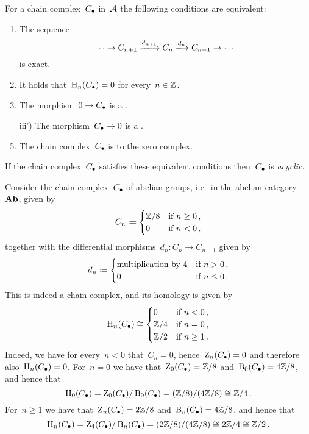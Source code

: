 \begin{remarkdefinition}
  For a chain complex~$C_\bullet$ in~$\mathcal{A}$ the following conditions are equivalent:
  \begin{enumerate}
    \item
      The sequence
      \[
        \dotsb
        \to
        C_{n+1}
        \xlongto{d_{n+1}}
        C_n
        \xlongto{d_n}
        C_{n-1}
        \to
        \dotsb
      \]
      is exact.
    \item
      It holds that~$\operatorname{H}_n(C_\bullet) = 0$ for every~$n \in \mathbb{Z}$.
    \item
      The morphism~$0 \to C_\bullet$ is a {\qim}.
    \item[iii')]
      The morphism~$C_\bullet \to 0$ is a {\qim}.
    \item
      The chain complex~$C_\bullet$ is {\qic} to the zero complex.
  \end{enumerate}
  If the chain complex~$C_\bullet$ satisfies these equivalent conditions then~$C_\bullet$ is \emph{acyclic}.
\end{remarkdefinition}


\begin{example}
  Consider the chain complex~$C_\bullet$ of abelian groups, i.e.\ in the abelian category~$\mathbf{Ab}$, given by
  \[
              C_n
    \coloneqq  \begin{cases}
                \mathbb{Z}/8  & \text{if~$n \geq 0$}  \,, \\
                0           & \text{if~$n < 0$} \,,
              \end{cases}
  \]
  together with the differential morphisms~$d_n \colon C_n \to C_{n-1}$ given by
  \[
              d_n
    \coloneqq  \begin{cases}
                \text{multiplication by~$4$}  & \text{if~$n > 0$} \,, \\
                0                             & \text{if~$n \leq 0$}  \,.
              \end{cases}
  \]
  This is indeed a chain complex, and its homology is given by
  \[
          \operatorname{H}_n(C_\bullet)
    \cong \begin{cases}
            0           & \text{if~$n < 0$}     \,, \\
            \mathbb{Z}/4  & \text{if~$n = 0$}     \,, \\
            \mathbb{Z}/2  & \text{if~$n \geq 1$}  \,. \\
          \end{cases}
  \]
  Indeed, we have for every~$n < 0$ that~$C_n = 0$, hence~$\operatorname{Z}_n(C_\bullet) = 0$ and therefore also~$\operatorname{H}_n(C_\bullet) = 0$.
  For~$n = 0$ we have that~$\operatorname{Z}_0(C_\bullet) = \mathbb{Z}/8$ and~$\operatorname{B}_0(C_\bullet) = 4\mathbb{Z}/8$, and hence that
  \[
          \operatorname{H}_0(C_\bullet)
    =     \operatorname{Z}_0(C_\bullet) / \operatorname{B}_0(C_\bullet)
    =     (\mathbb{Z}/8) / (4\mathbb{Z}/8)
    \cong \mathbb{Z}/4 \,.
  \]
  For~$n \geq 1$ we have that~$\operatorname{Z}_n(C_\bullet) = 2\mathbb{Z}/8$ and~$\operatorname{B}_n(C_\bullet) = 4\mathbb{Z}/8$, and hence that
  \[
          \operatorname{H}_n(C_\bullet)
    =     \operatorname{Z}_4(C_\bullet) / \operatorname{B}_n(C_\bullet)
    =     (2 \mathbb{Z}/8) / (4\mathbb{Z}/8)
    \cong 2\mathbb{Z}/4
    \cong \mathbb{Z}/2 \,.
  \]
\end{example}


